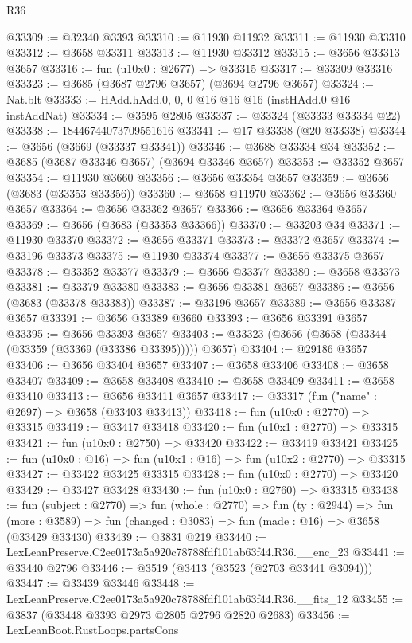 \begin{lexlean}{R36}
\begin{coremodule}
@33309 := @32340 @3393
@33310 := @11930 @11932
@33311 := @11930 @33310
@33312 := @3658 @33311
@33313 := @11930 @33312
@33315 := @3656 @33313 @3657
@33316 := fun (u10x0 : @2677) => @33315
@33317 := @33309 @33316
@33323 := @3685 (@3687 @2796 @3657) (@3694 @2796 @3657)
@33324 := Nat.blt
@33333 := HAdd.hAdd.{0, 0, 0} @16 @16 @16 (instHAdd.{0} @16 instAddNat)
@33334 := @3595 @2805
@33337 := @33324 (@33333 @33334 @22)
@33338 := 18446744073709551616
@33341 := @17 @33338 (@20 @33338)
@33344 := @3656 (@3669 (@33337 @33341))
@33346 := @3688 @33334 @34
@33352 := @3685 (@3687 @33346 @3657) (@3694 @33346 @3657)
@33353 := @33352 @3657
@33354 := @11930 @3660
@33356 := @3656 @33354 @3657
@33359 := @3656 (@3683 (@33353 @33356))
@33360 := @3658 @11970
@33362 := @3656 @33360 @3657
@33364 := @3656 @33362 @3657
@33366 := @3656 @33364 @3657
@33369 := @3656 (@3683 (@33353 @33366))
@33370 := @33203 @34
@33371 := @11930 @33370
@33372 := @3656 @33371
@33373 := @33372 @3657
@33374 := @33196 @33373
@33375 := @11930 @33374
@33377 := @3656 @33375 @3657
@33378 := @33352 @33377
@33379 := @3656 @33377
@33380 := @3658 @33373
@33381 := @33379 @33380
@33383 := @3656 @33381 @3657
@33386 := @3656 (@3683 (@33378 @33383))
@33387 := @33196 @3657
@33389 := @3656 @33387 @3657
@33391 := @3656 @33389 @3660
@33393 := @3656 @33391 @3657
@33395 := @3656 @33393 @3657
@33403 := @33323 (@3656 (@3658 (@33344 (@33359 (@33369 (@33386 @33395))))) @3657)
@33404 := @29186 @3657
@33406 := @3656 @33404 @3657
@33407 := @3658 @33406
@33408 := @3658 @33407
@33409 := @3658 @33408
@33410 := @3658 @33409
@33411 := @3658 @33410
@33413 := @3656 @33411 @3657
@33417 := @33317 (fun ("name" : @2697) => @3658 (@33403 @33413))
@33418 := fun (u10x0 : @2770) => @33315
@33419 := @33417 @33418
@33420 := fun (u10x1 : @2770) => @33315
@33421 := fun (u10x0 : @2750) => @33420
@33422 := @33419 @33421
@33425 := fun (u10x0 : @16) => fun (u10x1 : @16) => fun (u10x2 : @2770) => @33315
@33427 := @33422 @33425 @33315
@33428 := fun (u10x0 : @2770) => @33420
@33429 := @33427 @33428
@33430 := fun (u10x0 : @2760) => @33315
@33438 := fun (subject : @2770) =>
  fun (whole : @2770) =>
  fun (ty : @2944) =>
  fun (more : @3589) => fun (changed : @3083) => fun (made : @16) => @3658 (@33429 @33430)
@33439 := @3831 @219
@33440 := LexLeanPreserve.C2ee0173a5a920c78788fdf101ab63f44.R36.__enc_23
@33441 := @33440 @2796
@33446 := @3519 (@3413 (@3523 (@2703 @33441 @3094)))
@33447 := @33439 @33446
@33448 := LexLeanPreserve.C2ee0173a5a920c78788fdf101ab63f44.R36.__fits_12
@33455 := @3837 (@33448 @3393 @2973 @2805 @2796 @2820 @2683)
@33456 := LexLeanBoot.RustLoops.partsCons

\end{coremodule}
\end{lexlean}

